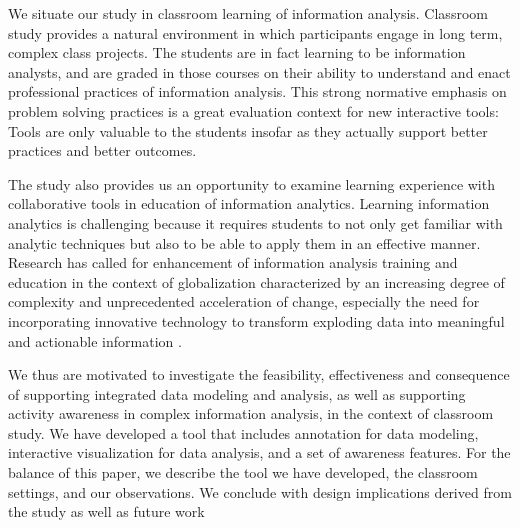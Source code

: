 We situate our study in classroom learning of information analysis.
Classroom study provides a natural environment in which participants
engage in long term, complex class projects. The students are in fact
learning to be information analysts, and are graded in those courses on
their ability to understand and enact professional practices of
information analysis. This strong normative emphasis on problem solving
practices is a great evaluation context for new interactive tools: Tools
are only valuable to the students insofar as they actually support
better practices and better outcomes.

The study also provides us an opportunity to examine learning experience
with collaborative tools in education of information analytics. Learning
information analytics is challenging because it requires students to not
only get familiar with analytic techniques but also to be able to apply
them in an effective manner. Research has called for enhancement of
information analysis training and education in the context of
globalization characterized by an increasing degree of complexity and
unprecedented acceleration of change, especially the need for
incorporating innovative technology to transform exploding data into
meaningful and actionable information \autocite{Martin2014}.

We thus are motivated to investigate the feasibility, effectiveness and
consequence of supporting integrated data modeling and analysis, as well
as supporting activity awareness in complex information analysis, in the
context of classroom study. We have developed a tool that includes
annotation for data modeling, interactive visualization for data
analysis, and a set of awareness features. For the balance of this
paper, we describe the tool we have developed, the classroom settings,
and our observations. We conclude with design implications derived from
the study as well as future work